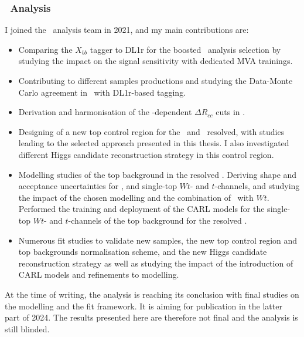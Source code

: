 \subsubsection{\boldvhbc\ Analysis}
I joined the \vhbc\ analysis team in 2021, and my main contributions are:
\begin{itemize}
    \item Comparing the $X_{bb}$ tagger to DL1r for the boosted \vhb\ analysis selection by studying the impact on the signal sensitivity with dedicated MVA trainings.
    \item Contributing to different samples productions and studying the Data-Monte Carlo agreement in \vhc\ with DL1r-based tagging. 
    \item Derivation and harmonisation of the \ptv-dependent $\Delta R_{cc}$ cuts in \vhc.
    \item Designing of a new top control region for the \vhc\ and \vhb\ resolved, with studies leading to the selected approach presented in this thesis. I also investigated different Higgs candidate reconstruction strategy in this control region.
    \item Modelling studies of the top background in the resolved \vhb. Deriving shape and acceptance uncertainties for \ttb, and single-top $Wt$- and $t$-channels, and studying the impact of the chosen modelling and the combination of \ttb\ with $Wt$. Performed the training and deployment of the CARL models for the single-top $Wt$- and $t$-channels of the top background for the resolved \vhb. 
    \item Numerous fit studies to validate new samples, the new top control region and top backgrounds normalisation scheme, and the new Higgs candidate reconstruction strategy as well as studying the impact of the introduction of CARL models and refinements to modelling.
\end{itemize}
At the time of writing, the analysis is reaching its conclusion with final studies on the modelling and the fit framework. It is aiming for publication in the latter part of 2024. The results presented here are therefore not final and the analysis is still blinded.